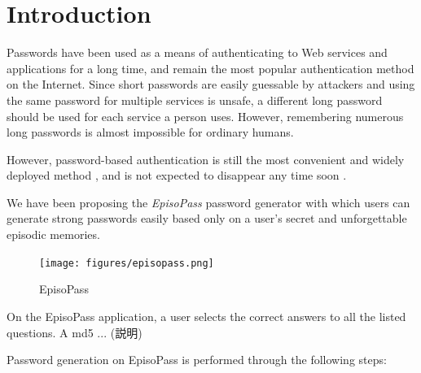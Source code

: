 \documentclass[sigconf]{acmart}
\begin{document}



\maketitle

%
\section{Introduction}

Passwords have been used as a means of authenticating to Web services
and applications for a long time, and remain the most popular
authentication method on the Internet.
Since short passwords are easily guessable by attackers and using the
same password for multiple services is unsafe, a different long
password should be used for each service a person uses.  However,
remembering numerous long passwords is almost impossible for ordinary
humans.

However, password-based authentication is still the most convenient
and widely deployed method \cite{Bonneau:ReplacePasswords}, and is not
expected to disappear any time soon \cite{Herley:2009:PSS:1601990.1602010}.

We have been proposing the \textit{EpisoPass} password generator with which 
users can generate strong passwords easily
based only on a user's secret and unforgettable episodic memories.


\begin{figure}
  \centerline{\texttt{[image: figures/episopass.png]}}
  \caption{EpisoPass}
  \label{fig:sample}
\end{figure}

On the EpisoPass application,
a user selects the correct answers to all the listed questions.
A md5 ... (説明)

Password generation on EpisoPass is performed through the following steps:
\end{document}
